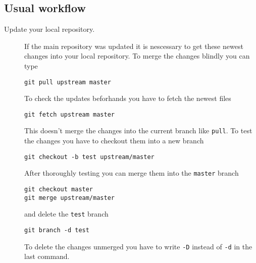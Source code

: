 \documentclass[a4paper,10pt]{scrartcl}
\begin{document}
\subsection*{Usual workflow}
\begin{description}
  \item[Update your local repository.] If the main repository was updated it is nescessary to get these newest changes into your local repository.
    To merge the changes blindly you can type
\begin{lstlisting}
git pull upstream master
    \end{lstlisting}
    To check the updates beforhands you have to fetch the newest files
\begin{lstlisting}
git fetch upstream master
\end{lstlisting}
    This doesn't merge the changes into the current branch like \texttt{pull}. To test the changes you have to checkout them into a new branch
\begin{lstlisting}
git checkout -b test upstream/master
\end{lstlisting}
    After thoroughly testing you can merge them into the \texttt{master} branch
\begin{lstlisting}
git checkout master
git merge upstream/master
\end{lstlisting}
    and delete the \texttt{test} branch
\begin{lstlisting}
git branch -d test
\end{lstlisting}
    To delete the changes unmerged you have to write \texttt{-D} instead of \texttt{-d} in the last command.
\end{description}
\end{document}
